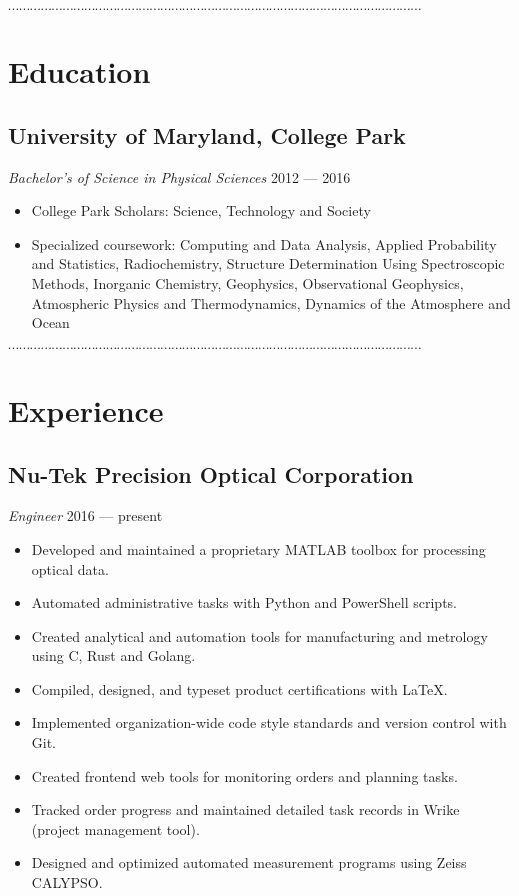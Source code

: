 \documentclass[10pt]{article}
\newcommand{\dotfringe}{
    \begin{center}
      $\cdots\cdots\cdots\cdots\cdots\cdots\cdots\cdots\cdots\cdots\cdots\cdots\cdots\cdots\cdots\cdots\cdots\cdots\cdots\cdots\cdots\cdots\cdots\cdots\cdots\cdots\cdots\cdots\cdots\cdots\cdots\cdots\cdots\cdots\cdots\cdots\cdots\cdots$
    \end{center}
}
\begin{document}

\dotfringe{}

\section*{Education}
\subsection*{University of Maryland, College Park}
\textit{Bachelor's of Science in Physical Sciences} \hfill 2012 --- 2016
\begin{itemize}
  \item College Park Scholars: Science, Technology and Society
  \item Specialized coursework: Computing and Data Analysis, Applied Probability and Statistics, Radiochemistry, Structure Determination Using Spectroscopic Methods, Inorganic Chemistry, Geophysics, Observational Geophysics, Atmospheric Physics and Thermodynamics, Dynamics of the Atmosphere and Ocean
\end{itemize}

\dotfringe{}

\section*{Experience}
\subsection*{Nu-Tek Precision Optical Corporation}
\textit{Engineer} \hfill 2016 --- present
\begin{itemize}
  \item Developed and maintained a proprietary MATLAB toolbox for processing optical data.
  \item Automated administrative tasks with Python and PowerShell scripts.
  \item Created analytical and automation tools for manufacturing and metrology using C, Rust and Golang.
  \item Compiled, designed, and typeset product  certifications with \LaTeX{}.
  \item Implemented organization-wide code style standards and version control with Git.
  \item Created frontend web tools for monitoring orders and planning tasks.
  \item Tracked order progress and maintained detailed task records in Wrike (project management tool).
  \item Designed and optimized automated measurement programs using Zeiss CALYPSO.\@
\end{itemize}
\end{document}
